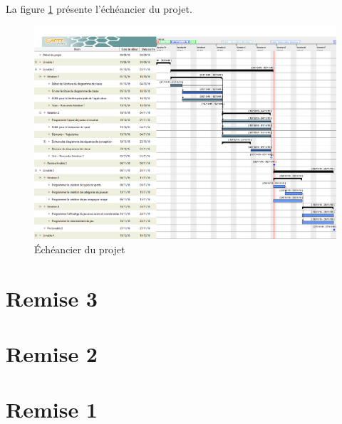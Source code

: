 \documentclass[ULlof]{ULrapport}
\begin{document}
La figure \ref{fig:gantt} présente l'échéancier du projet.

\begin{figure}[p]
	\centering
	\includegraphics[scale=0.35, angle=90]{fig/diagrams4/gantt.png}
	\caption{Échéancier du projet}
	\label{fig:gantt}
\end{figure}

\appendix

\chapter{Remise 3}


\chapter{Remise 2}


\chapter{Remise 1}

\end{document}
